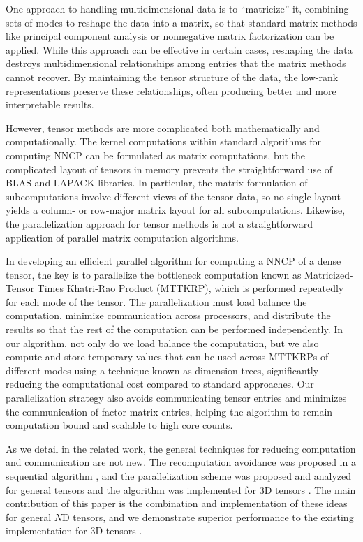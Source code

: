 One approach to handling multidimensional data is to ``matricize'' it, combining sets of modes to reshape the data into a matrix, so that standard matrix  methods like principal component analysis or nonnegative matrix factorization can be applied.
While this approach can be effective in certain cases, reshaping the data destroys multidimensional relationships among entries that the matrix methods cannot recover.
By maintaining the tensor structure of the data, the low-rank representations preserve these relationships, often producing better and more interpretable results.

However, tensor methods are more complicated both mathematically and computationally.
The kernel computations within standard algorithms for computing NNCP can be formulated as matrix computations, but the complicated layout of tensors in memory prevents the straightforward use of BLAS and LAPACK libraries.
In particular, the matrix formulation of subcomputations involve different views of the tensor data, so no single layout yields a column- or row-major matrix layout for all subcomputations.
Likewise, the parallelization approach for tensor methods is not a straightforward application of parallel matrix computation algorithms.

In developing an efficient parallel algorithm for computing a NNCP of a dense tensor, the key is to parallelize the bottleneck computation known as Matricized-Tensor Times Khatri-Rao Product (MTTKRP), which is performed repeatedly for each mode of the tensor.
The parallelization must load balance the computation, minimize communication across processors, and distribute the results so that the rest of the computation can be performed independently.
In our algorithm, not only do we load balance the computation, but we also compute and store temporary values that can be used across MTTKRPs of different modes using a technique known as dimension trees, significantly reducing the computational cost compared to standard approaches.
Our parallelization strategy also avoids communicating tensor entries and minimizes the communication of factor matrix entries, helping the algorithm to remain computation bound and scalable to high core counts.

As we detail in the related work, the general techniques for reducing computation and communication are not new.
The recomputation avoidance was proposed in a sequential algorithm \cite{PTC13a}, and the parallelization scheme was proposed and analyzed for general tensors \cite{BKR17-TR} and the algorithm was implemented for 3D tensors \cite{LK+17b}.
The main contribution of this paper is the combination and implementation of these ideas for general $N$D tensors, and we demonstrate superior performance to the existing implementation for 3D tensors \cite{LK+17b}.

